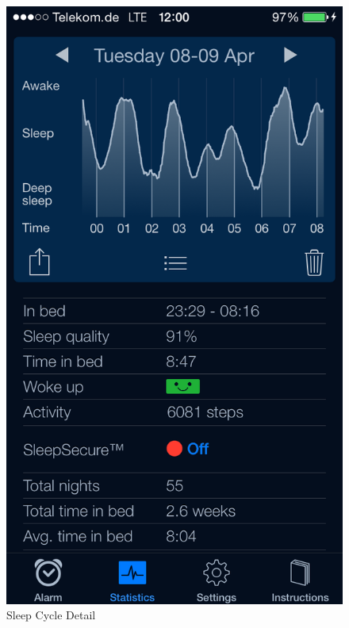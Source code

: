 \begin{figure}[H]
  \centering
  \begin{minipage}[b]{0.47\textwidth}
    \centering
    \includegraphics[scale=0.3]{images/SleepCycle/Detail} 
    \caption{Sleep Cycle Detail}
    \label{fig:SCDetail}
  \end{minipage}
  \begin{minipage}[b]{0.47\textwidth}
    \centering

\end{minipage}
\end{figure}
